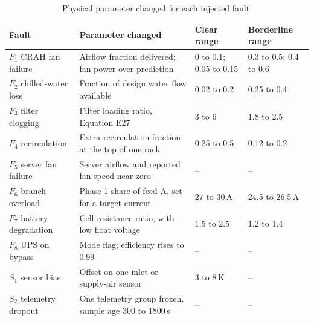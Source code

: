 \begin{table}[htbp]
  \centering
  \small
  \caption{Physical parameter changed for each injected fault.}
  \label{tab:fault-params}
  \begin{tabular}{L{3.2cm}L{6.4cm}L{2.2cm}L{2.2cm}}
    \toprule
    Fault & Parameter changed & Clear range & Borderline range \\
    \midrule
    $F_1$ CRAH fan failure & Airflow fraction delivered; fan power over prediction & 0 to 0.1; 0.05 to 0.15 & 0.3 to 0.5; 0.4 to 0.6 \\
    $F_2$ chilled-water loss & Fraction of design water flow available & 0.02 to 0.2 & 0.25 to 0.4 \\
    $F_3$ filter clogging & Filter loading ratio, Equation E27 & 3 to 6 & 1.8 to 2.5 \\
    $F_4$ recirculation & Extra recirculation fraction at the top of one rack & 0.25 to 0.5 & 0.12 to 0.2 \\
    $F_5$ server fan failure & Server airflow and reported fan speed near zero & -- & -- \\
    $F_6$ branch overload & Phase 1 share of feed A, set for a target current & 27 to 30\,A & 24.5 to 26.5\,A \\
    $F_7$ battery degradation & Cell resistance ratio, with low float voltage & 1.5 to 2.5 & 1.2 to 1.4 \\
    $F_8$ UPS on bypass & Mode flag; efficiency rises to 0.99 & -- & -- \\
    $S_1$ sensor bias & Offset on one inlet or supply-air sensor & 3 to 8\,K & -- \\
    $S_2$ telemetry dropout & One telemetry group frozen, sample age 300 to 1800\,s & -- & -- \\
    \bottomrule
  \end{tabular}
\end{table}

